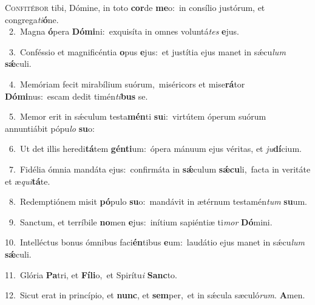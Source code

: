 \lettrine{\initial\textcolor{\initialcolor}{C}}{onfitébor} tibi, Dómine, in toto \textbf{cor}\-de \textbf{me}\-o:~\star in consílio justórum, et congrega\-\textit{ti}\-\textbf{ó}ne.\\
{\numbfont\textcolor{\numbcolor}{~2.}}~Magna \textbf{ó}\-pera \textbf{Dó}\-\textbf{mi}ni:~\star exquisíta in omnes voluntá\textit{tes} \textbf{e}\-jus.\par
{\numbfont\textcolor{\numbcolor}{~3.}}~Conféssio et magnificéntia \textbf{o}\-pus \textbf{e}\-jus:~\star et justítia ejus manet in sǽcu\textit{lum} \textbf{sǽ}\-culi.\par
{\numbfont\textcolor{\numbcolor}{~4.}}~Memóriam fecit mirabílium suórum,~\dagger miséricors et mise\-\textbf{rá}\-tor \textbf{Dó}\-\textbf{mi}nus:~\star escam dedit timén\-\textit{ti}\-\textbf{bus} se.\par
{\numbfont\textcolor{\numbcolor}{~5.}}~Memor erit in sǽculum testa\-\textbf{mén}\-ti \textbf{su}\-i:~\star virtútem óperum suórum annuntiábit pópu\textit{lo} \textbf{su}\-o:\par
{\numbfont\textcolor{\numbcolor}{~6.}}~Ut det illis heredi\-\textbf{tá}\-tem \textbf{gén}\-\textbf{ti}um:~\star ópera mánuum ejus véritas, et \textit{ju}\-\textbf{dí}cium.\par
{\numbfont\textcolor{\numbcolor}{~7.}}~Fidélia ómnia mandáta ejus:~\dagger confirmáta in \textbf{sǽ}\-culum \textbf{sǽ}\-\textbf{cu}li,~\star facta in veritáte et æ\-\textit{qui}\-\textbf{tá}te.\par
{\numbfont\textcolor{\numbcolor}{~8.}}~Redemptiónem misit \textbf{pó}\-pulo \textbf{su}\-o:~\star mandávit in ætérnum testamén\textit{tum} \textbf{su}\-um.\par
{\numbfont\textcolor{\numbcolor}{~9.}}~Sanctum, et terríbile \textbf{no}\-men \textbf{e}\-jus:~\star inítium sapiéntiæ ti\textit{mor} \textbf{Dó}\-mini.\par
{\numbfont\textcolor{\numbcolor}{10.}}~Intelléctus bonus ómnibus faci\-\textbf{én}\-tibus \textbf{e}\-um:~\star laudátio ejus manet in sǽcu\textit{lum} \textbf{sǽ}\-culi.\par
{\numbfont\textcolor{\numbcolor}{11.}}~Glória \textbf{Pa}\-tri, et \textbf{Fí}\-\textbf{li}o,~\star et Spirítu\textit{i} \textbf{Sanc}\-to.\par
{\numbfont\textcolor{\numbcolor}{12.}}~Sicut erat in princípio, et \textbf{nunc}\-, et \textbf{sem}\-per,~\star et in sǽcula sæculó\-\textit{rum}\-. \textbf{A}\-men.\par
